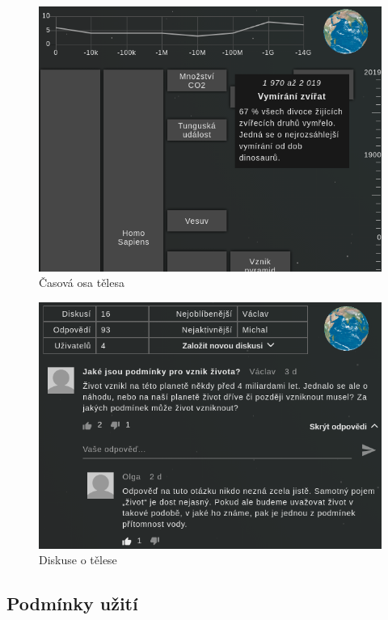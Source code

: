 \documentclass[a4paper,12pt]{article}
\begin{document}
\begin{figure}[H]
\begin{center}
\includegraphics[width=350pt]{Images/Timeline.png}
\caption{Časová osa tělesa}
\end{center}
\end{figure}

\begin{figure}[H]
\begin{center}
\includegraphics[width=350pt]{Images/Discussion.png}
\caption{Diskuse o tělese}
\end{center}
\end{figure}

\subsection{Podmínky užití}
\end{document}
